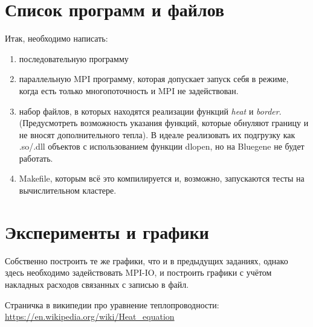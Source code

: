 \documentclass[10pt, a4paper]{article}
\begin{document}
\section{Список программ и файлов}

Итак, необходимо написать:
\begin{enumerate}
    \item последовательную программу
    \item параллельную  MPI программу, которая допускает запуск себя в режиме, 
          когда есть только многопоточность и MPI не задействован.
    \item набор файлов, в которых находятся реализации функций \textit{heat} и 
          \textit{border}. (Предусмотреть возможность указания функций, которые обнуляют
          границу и не вносят дополнительного тепла). В идеале реализовать их подгрузку как 
          .so/.dll объектов с использованием функции dlopen, но на Bluegene не будет работать. 
    \item Makefile, которым всё это компилируется и, возможно, запускаются 
          тесты на вычислительном кластере.
\end{enumerate}

\section{Эксперименты и графики}

Собственно построить те же графики, что и в предыдущих заданиях, однако здесь необходимо задействовать
MPI-IO, и построить графики с учётом накладных расходов связанных с записью в файл.





\begin{thebibliography}{50}
     Страничка в википедии про уравнение теплопроводности: 
        \url{https://en.wikipedia.org/wiki/Heat_equation}
\end{thebibliography}
\end{document}
